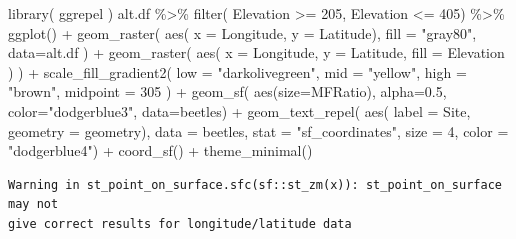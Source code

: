 \documentclass[
  letterpaper,
]{book}
\newenvironment{Shaded}{\begin{snugshade}}{\end{snugshade}}
\newcommand{\AttributeTok}[1]{\textcolor[rgb]{0.40,0.45,0.13}{#1}}
\newcommand{\DecValTok}[1]{\textcolor[rgb]{0.68,0.00,0.00}{#1}}
\newcommand{\FloatTok}[1]{\textcolor[rgb]{0.68,0.00,0.00}{#1}}
\newcommand{\FunctionTok}[1]{\textcolor[rgb]{0.28,0.35,0.67}{#1}}
\newcommand{\NormalTok}[1]{\textcolor[rgb]{0.00,0.23,0.31}{#1}}
\newcommand{\SpecialCharTok}[1]{\textcolor[rgb]{0.37,0.37,0.37}{#1}}
\newcommand{\StringTok}[1]{\textcolor[rgb]{0.13,0.47,0.30}{#1}}
\begin{document}
\begin{Shaded}
\begin{Highlighting}[]
\FunctionTok{library}\NormalTok{( ggrepel )}
\NormalTok{alt.df }\SpecialCharTok{\%\textgreater{}\%}
  \FunctionTok{filter}\NormalTok{( Elevation }\SpecialCharTok{\textgreater{}=} \DecValTok{205}\NormalTok{,}
\NormalTok{          Elevation }\SpecialCharTok{\textless{}=} \DecValTok{405}\NormalTok{) }\SpecialCharTok{\%\textgreater{}\%}
  \FunctionTok{ggplot}\NormalTok{() }\SpecialCharTok{+} 
  \FunctionTok{geom\_raster}\NormalTok{( }\FunctionTok{aes}\NormalTok{( }\AttributeTok{x =}\NormalTok{ Longitude,}
                    \AttributeTok{y =}\NormalTok{ Latitude),}
               \AttributeTok{fill =} \StringTok{"gray80"}\NormalTok{, }
               \AttributeTok{data=}\NormalTok{alt.df ) }\SpecialCharTok{+} 
  \FunctionTok{geom\_raster}\NormalTok{( }\FunctionTok{aes}\NormalTok{( }\AttributeTok{x =}\NormalTok{ Longitude,}
                    \AttributeTok{y =}\NormalTok{ Latitude, }
                    \AttributeTok{fill =}\NormalTok{ Elevation ) ) }\SpecialCharTok{+} 
  \FunctionTok{scale\_fill\_gradient2}\NormalTok{( }\AttributeTok{low =} \StringTok{"darkolivegreen"}\NormalTok{,}
                        \AttributeTok{mid =} \StringTok{"yellow"}\NormalTok{,}
                        \AttributeTok{high =} \StringTok{"brown"}\NormalTok{, }
                        \AttributeTok{midpoint =} \DecValTok{305}\NormalTok{ ) }\SpecialCharTok{+}
  \FunctionTok{geom\_sf}\NormalTok{( }\FunctionTok{aes}\NormalTok{(}\AttributeTok{size=}\NormalTok{MFRatio), }
           \AttributeTok{alpha=}\FloatTok{0.5}\NormalTok{, }
           \AttributeTok{color=}\StringTok{"dodgerblue3"}\NormalTok{, }
           \AttributeTok{data=}\NormalTok{beetles) }\SpecialCharTok{+}
  \FunctionTok{geom\_text\_repel}\NormalTok{( }\FunctionTok{aes}\NormalTok{( }\AttributeTok{label =}\NormalTok{ Site,}
                        \AttributeTok{geometry =}\NormalTok{ geometry),}
                   \AttributeTok{data =}\NormalTok{ beetles,}
                   \AttributeTok{stat =} \StringTok{"sf\_coordinates"}\NormalTok{, }
                   \AttributeTok{size =} \DecValTok{4}\NormalTok{, }
                   \AttributeTok{color =} \StringTok{"dodgerblue4"}\NormalTok{) }\SpecialCharTok{+} 
  \FunctionTok{coord\_sf}\NormalTok{() }\SpecialCharTok{+} 
  \FunctionTok{theme\_minimal}\NormalTok{() }
\end{Highlighting}
\end{Shaded}

\begin{verbatim}
Warning in st_point_on_surface.sfc(sf::st_zm(x)): st_point_on_surface may not
give correct results for longitude/latitude data
\end{verbatim}
\end{document}
